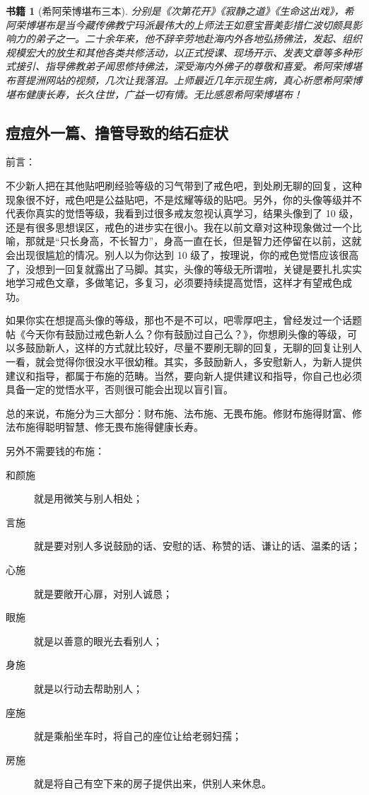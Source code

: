 \documentclass{ctexart}
\newtheorem{book}{书籍}
\begin{document}
\begin{book}[希阿荣博堪布三本]
    分别是《次第花开》《寂静之道》《生命这出戏》，希阿荣博堪布是当今藏传佛教宁玛派最伟大的上师法王如意宝晋美彭措仁波切颇具影响力的弟子之一。二十余年来，他不辞辛劳地赴海内外各地弘扬佛法，发起、组织规模宏大的放生和其他各类共修活动，以正式授课、现场开示、发表文章等多种形式接引、指导佛教弟子闻思修持佛法，深受海内外佛子的尊敬和喜爱。希阿荣博堪布菩提洲网站的视频，几次让我落泪。上师最近几年示现生病，真心祈愿希阿荣博堪布健康长寿，长久住世，广益一切有情。无比感恩希阿荣博堪布！
\end{book}

\subsection{痘痘外一篇、撸管导致的结石症状}

前言：

不少新人把在其他贴吧刷经验等级的习气带到了戒色吧，到处刷无聊的回复，这种现象很不好，戒色吧是公益贴吧，不是炫耀等级的贴吧。另外，你的头像等级并不代表你真实的觉悟等级，我看到过很多戒友忽视认真学习，结果头像到了 10 级，还是有很多思想误区，戒色的进步实在很小。我在以前文章对这种现象做过一个比喻，那就是“只长身高，不长智力”，身高一直在长，但是智力还停留在以前，这就会出现很尴尬的情况。别人以为你达到 10 级了，按理说，你的戒色觉悟应该很高了，没想到一回复就露出了马脚。其实，头像的等级无所谓啦，关键是要扎扎实实地学习戒色文章，多做笔记，多复习，必须要持续提高觉悟，这样才有望戒色成功。

如果你实在想提高头像的等级，那也不是不可以，吧零厚吧主，曾经发过一个话题帖《今天你有鼓励过戒色新人么？你有鼓励过自己么？》，你想刷头像的等级，可以多鼓励新人，这样的方式就比较好，尽量不要刷无聊的回复，无聊的回复让别人一看，就会觉得你很没水平很幼稚。其实，多鼓励新人，多安慰新人，为新人提供建议和指导，都属于布施的范畴。当然，要向新人提供建议和指导，你自己也必须具备一定的觉悟水平，否则很可能会出现以盲引盲。

总的来说，布施分为三大部分：财布施、法布施、无畏布施。修财布施得财富、修法布施得聪明智慧、修无畏布施得健康长寿。

另外不需要钱的布施：

\begin{description}
    \item[和颜施] 就是用微笑与别人相处；
    \item[言施] 就是要对别人多说鼓励的话、安慰的话、称赞的话、谦让的话、温柔的话；
    \item[心施] 就是要敞开心扉，对别人诚恳；
    \item[眼施] 就是以善意的眼光去看别人；
    \item[身施] 就是以行动去帮助别人；
    \item[座施] 就是乘船坐车时，将自己的座位让给老弱妇孺；
    \item[房施] 就是将自己有空下来的房子提供出来，供别人来休息。
\end{description}
\end{document}
